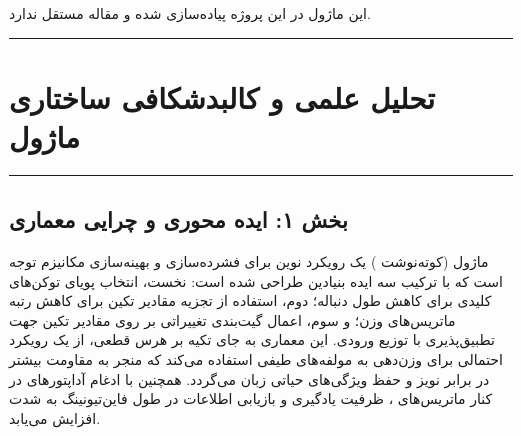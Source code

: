 \clearpage
{}
\vspace*{0.2cm}

این ماژول در این پروژه پیاده‌سازی شده و مقاله مستقل ندارد.
\noindent\rule{\textwidth}{1.2pt}
\vspace*{0.1cm}
\section{تحلیل علمی و کالبدشکافی ساختاری ماژول }
\label{sec:mod_vspec}
\vspace*{-0.2cm}
\noindent\rule{\textwidth}{0.5pt}
\vspace*{0.3cm}

\subsection*{بخش ۱: ایده محوری و چرایی معماری }
ماژول  (کوته‌نوشت ) یک رویکرد نوین برای فشرده‌سازی و بهینه‌سازی مکانیزم توجه است که با ترکیب سه ایده بنیادین طراحی شده است: نخست، انتخاب پویای توکن‌های کلیدی  برای کاهش طول دنباله؛ دوم، استفاده از تجزیه مقادیر تکین  برای کاهش رتبه ماتریس‌های وزن؛ و سوم، اعمال گیت‌بندی تغییراتی  بر روی مقادیر تکین جهت تطبیق‌پذیری با توزیع ورودی. این معماری به جای تکیه بر هرس قطعی، از یک رویکرد احتمالی برای وزن‌دهی به مولفه‌های طیفی استفاده می‌کند که منجر به مقاومت بیشتر در برابر نویز و حفظ ویژگی‌های حیاتی زبان می‌گردد. همچنین با ادغام آداپتورهای  در کنار ماتریس‌های ، ظرفیت یادگیری و بازیابی اطلاعات در طول فاین‌تیونینگ به شدت افزایش می‌یابد.

